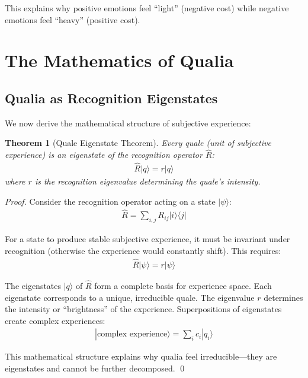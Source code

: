 \documentclass[12pt,a4paper]{article}
\newtheorem{theorem}{Theorem}[section]
\begin{document}
This explains why positive emotions feel ``light'' (negative cost) while negative emotions feel ``heavy'' (positive cost).

\section{The Mathematics of Qualia}

\subsection{Qualia as Recognition Eigenstates}

We now derive the mathematical structure of subjective experience:

\begin{theorem}[Quale Eigenstate Theorem]
Every quale (unit of subjective experience) is an eigenstate of the recognition operator $\hat{R}$:
\begin{align}
\hat{R}|q\rangle = r|q\rangle
\end{align}
where $r$ is the recognition eigenvalue determining the quale's intensity.
\end{theorem}

\begin{proof}
Consider the recognition operator acting on a state $|\psi\rangle$:
\begin{align}
\hat{R} = \sum_{i,j} R_{ij}|i\rangle\langle j|
\end{align}

For a state to produce stable subjective experience, it must be invariant under recognition (otherwise the experience would constantly shift). This requires:
\begin{align}
\hat{R}|\psi\rangle = r|\psi\rangle
\end{align}

The eigenstates $|q\rangle$ of $\hat{R}$ form a complete basis for experience space. Each eigenstate corresponds to a unique, irreducible quale. The eigenvalue $r$ determines the intensity or ``brightness'' of the experience. Superpositions of eigenstates create complex experiences:
\begin{align}
|\text{complex experience}\rangle = \sum_i c_i|q_i\rangle
\end{align}

This mathematical structure explains why qualia feel irreducible—they are eigenstates and cannot be further decomposed. \qed
\end{proof}
\end{document}
